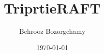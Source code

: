 \documentclass[12pt,a4paper]{book}
\begin{document}
\title{TriprtieRAFT}

\author{Behrooz Bozorgchamy}
\date{\today}
\maketitle{}


\tableofcontents
\listoffigures
\listoftables









\printbibliography



\end{document}
